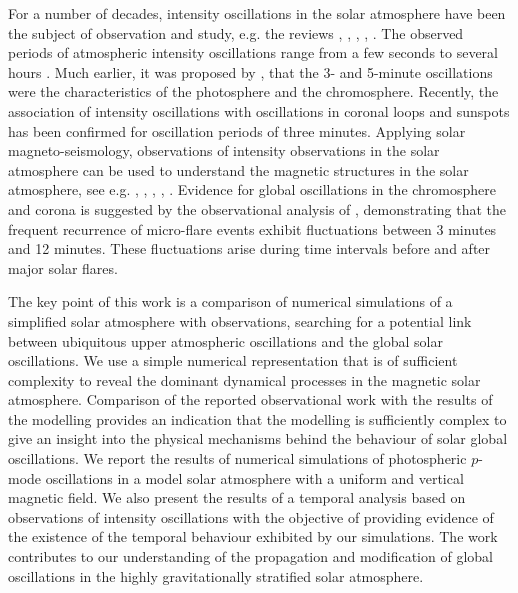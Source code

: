 \documentclass[physics,article,submit,pdftex,moreauthors]{Definitions/mdpi}
\begin{document}
 For a number of decades, intensity oscillations in the solar atmosphere have been the subject of observation and study, e.g. the reviews \cite{Banerjee2011}, \cite{deMoortel2009}, \cite{Mathioudakis2013}, \cite{Ruderman2009}, \cite{Wang2011}. The observed periods of atmospheric intensity oscillations range from  a few seconds to several hours \cite{Auchere2014}. Much earlier, it was proposed by \cite{Jensen1963}, that the 3- and 5-minute oscillations were the characteristics of the photosphere and the chromosphere. Recently, the association of intensity oscillations with oscillations in coronal loops and sunspots has been confirmed for oscillation periods of three minutes. Applying solar magneto-seismology, observations of intensity observations in the solar atmosphere can be used to understand the magnetic structures in the solar atmosphere, see e.g. \cite{Roberts1984}, \cite{Banerjee2007}, \cite{Zaqarashvili2007}, \cite{Erdelyi2008}, \cite{Verth2010}.  Evidence for global oscillations  in the chromosphere and corona is suggested by the observational analysis of \cite{Gyenge2018},  demonstrating that the frequent recurrence of micro-flare events exhibit fluctuations between 3 minutes and 12 minutes. These fluctuations arise during time intervals before and after major solar flares.


The key point of this work is a comparison of numerical simulations  of a simplified solar atmosphere with observations, searching for a  potential link between ubiquitous upper atmospheric oscillations and the global solar oscillations. We use a  simple numerical representation that is of sufficient complexity to reveal the dominant dynamical processes in the magnetic solar atmosphere. Comparison of the reported observational work with the results of the modelling provides an indication that the modelling is sufficiently complex to give an insight into the physical mechanisms behind the behaviour of solar global oscillations. We report the results of numerical simulations of photospheric $p$-mode oscillations in a model solar atmosphere with a uniform and vertical magnetic field. We also present the results of a temporal analysis based on observations of intensity oscillations with the objective of providing evidence of the existence of the temporal behaviour exhibited by our simulations. The work contributes to our understanding of the propagation and modification of global oscillations in the highly gravitationally stratified solar atmosphere. 




\end{document}

